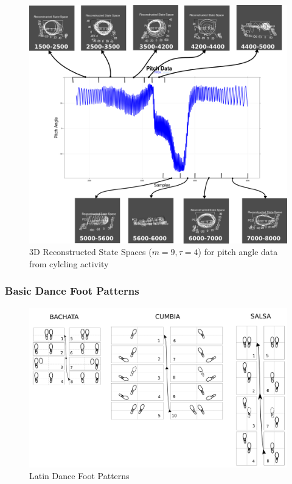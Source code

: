 \documentclass{beamer}
\theoremstyle{definition}
\begin{document}
\begin{frame}

\vspace{-5mm}
\begin{figure}
\includegraphics[scale=0.22]{cycling_rss}
\vspace{-3mm}
\caption{3D Reconstructed State Spaces ($m=9, \tau=4$) for pitch angle data 
from cylcling activity}
\end{figure}  
\end{frame}





\begin{frame}
\frametitle{Basic Dance Foot Patterns}

\begin{figure}
\includegraphics[scale=0.13]{basicdancefootpatterns}
\caption{Latin Dance Foot Patterns}
\end{figure}  
\end{frame}
\end{document}
